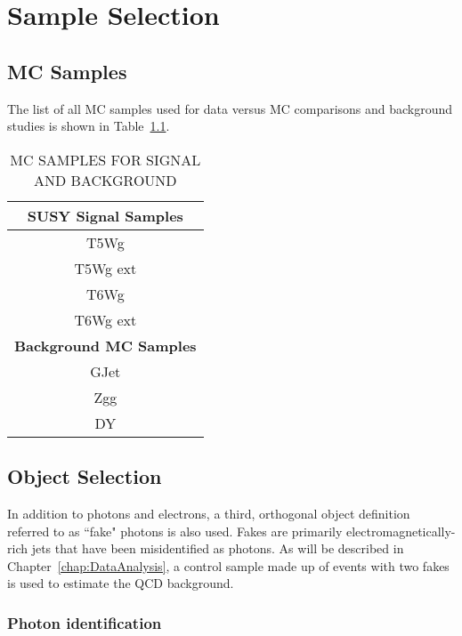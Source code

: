 \chapter{Sample Selection}
\label{chap:EventSelect}

\section{MC Samples}
\label{sec:MC}
The list of all MC samples used for data versus MC comparisons and background studies is shown in Table~\ref{tab:MC}.

\begin{table}[ht]
\caption{MC SAMPLES FOR SIGNAL AND BACKGROUND}
\label{tab:MC}
\begin{center}
\begin{tabular}{|c|}
\hline
\hline
\bf{SUSY Signal Samples}   \\         
\hline                                                                                         
T5Wg \\
T5Wg ext \\
T6Wg \\
T6Wg ext\\
\hline                                               
\bf{Background MC Samples} \\ 
\hline                                                                                      
GJet \\
Zgg \\
DY \\                     
\hline
\hline
\end{tabular}
\end{center}
\end{table}

\section{Object Selection}
\label{sec:ObjSelect}

In addition to photons and electrons, a third, orthogonal object definition referred to as ``fake" photons is also used. 
Fakes are primarily electromagnetically-rich jets that have been misidentified as photons. As will be described in Chapter~\ref{chap:DataAnalysis},
a control sample made up of events with two fakes is used to estimate the QCD background. 

\subsection{Photon identification}
\label{sec:phoID}


